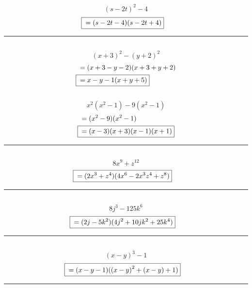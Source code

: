	\subsection{}
		\[{(s - 2t)}^2 - 4\]
		\begin{align*}
			\Aboxed{{} &= (s - 2t - 4)(s - 2t + 4)}
		\end{align*}
		\hrule{}

	\subsection{}
		\[{(x + 3)}^2 - {(y + 2)}^2\]
		\begin{align*}
			&= (x + 3 - y - 2)(x + 3 + y + 2) \\
			\Aboxed{{} &= {x - y - 1}(x + y + 5)}
		\end{align*}

	\subsection{}
		\[x^2(x^2 - 1) - 9(x^2 - 1)\]
		\begin{align*}
			&= (x^2 - 9)(x^2 - 1) \\
			\Aboxed{{} &= (x - 3)(x + 3)(x - 1)(x + 1)}
		\end{align*}
		\hrule{}

	\subsection{}
		\[8x^9 + z^{12}\]
		\begin{align*}
			\Aboxed{{} &= (2x^3 + z^4)(4x^6 - 2x^3z^4 + z^8)}
		\end{align*}
		\hrule{}

	\subsection{}
		\[8j^3 - 125k^6\]
		\begin{align*}
			\Aboxed{{} &= (2j - 5k^2)(4j^2 + 10jk^2 + 25k^4)}
		\end{align*}
		\hrule{}

	\subsection{}
		\[{(x - y)}^3 - 1\]
		\begin{align*}
			\Aboxed{{} &= (x - y - 1)({(x - y)}^2 + (x - y) + 1)}
		\end{align*}
		\hrule{}


